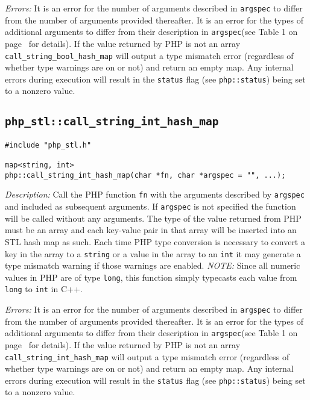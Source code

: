 \documentclass[11pt,titlepage]{article}
\begin{document}
\emph{Errors:} It is an error for the number of arguments described in \verb|argspec| to differ from the number of arguments provided thereafter. It is an error for the types of additional arguments to differ from their description in \verb|argspec|(see Table 1 on page~\pageref{Table1} for details). If the value returned by PHP is not an array \verb|call_string_bool_hash_map| will output a type mismatch error (regardless of whether type warnings are on or not) and return an empty map. Any internal errors during execution will result in the \verb|status| flag (see \verb|php::status|) being set to a nonzero value.


\subsection{\texttt{php\_stl::call\_string\_int\_hash\_map}}

\begin{verbatim}
#include "php_stl.h"

map<string, int> 
php::call_string_int_hash_map(char *fn, char *argspec = "", ...);
\end{verbatim}

\emph{Description:} Call the PHP function \verb|fn| with the arguments described by \verb|argspec| and included as subsequent arguments. If \verb|argspec| is not specified the function will be called without any arguments. The type of the value returned from PHP must be an array and each key-value pair in that array will be inserted into an STL hash map as such. Each time PHP type conversion is necessary to convert a key in the array to a \verb|string| or a value in the array to an \verb|int| it may generate a type mismatch warning if those warnings are enabled. \emph{NOTE:} Since all numeric values in PHP are of type \verb|long|, this function simply typecasts each value from \verb|long| to \verb|int| in C++.

\emph{Errors:} It is an error for the number of arguments described in \verb|argspec| to differ from the number of arguments provided thereafter. It is an error for the types of additional arguments to differ from their description in \verb|argspec|(see Table 1 on page~\pageref{Table1} for details). If the value returned by PHP is not an array \verb|call_string_int_hash_map| will output a type mismatch error (regardless of whether type warnings are on or not) and return an empty map. Any internal errors during execution will result in the \verb|status| flag (see \verb|php::status|) being set to a nonzero value.
\end{document}
